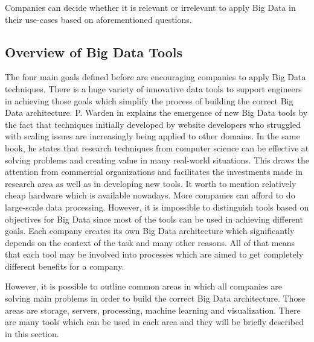 \documentclass[runningheads]{llncs}
\begin{document}
Companies can decide whether it is relevant or irrelevant to apply Big Data in their use-cases based on aforementioned questions.
\subsection{Overview of Big Data Tools}

The four main goals defined before are encouraging companies to apply Big Data techniques. There is a huge variety of innovative data tools to support engineers in achieving those goals which simplify the process of building the correct Big Data architecture. P. Warden in \cite{GLOSSARY} explains the emergence of new Big Data tools by the fact that techniques initially developed by website developers who struggled with scaling issues are increasingly being applied to other domains. In the same book, he states that research techniques from computer science can be effective at solving problems and creating value in many real-world situations. This draws the attention from commercial organizations and facilitates the investments made in research area as well as in developing new tools. It worth to mention relatively cheap hardware which is available nowadays. More companies can afford to do large-scale data processing. However, it is impossible to distinguish tools based on objectives for Big Data since most of the tools can be used in achieving different goals. Each company creates its own Big Data architecture which significantly depends on the context of the task and many other reasons. All of that means that each tool may be involved into processes which are aimed to get completely different benefits for a company.   

However, it is possible to outline common areas in which all companies are solving main problems in order to build the correct Big Data architecture. Those areas are storage, servers, processing, machine learning and visualization. There are many tools which can be used in each area and they will be briefly described in this section. 
\end{document}
